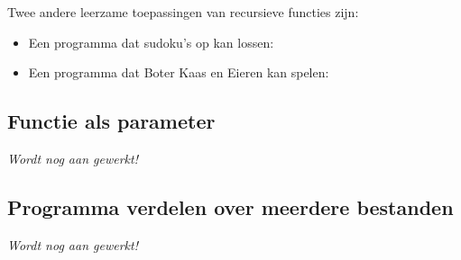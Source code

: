 Twee andere leerzame toepassingen van recursieve functies zijn:
\begin{itemize}
	\item
	Een programma dat sudoku's op kan lossen:
	\iftoggle{ebook}{%
		\href{https://bitbucket.org/HR_ELEKTRO/cpl01/downloads/sudokuEbook.pdf}{sudokuEbook.pdf}%
	}{
		\href{https://bitbucket.org/HR_ELEKTRO/cpl01/downloads/sudoku.pdf}{sudoku.pdf}%
	}
    \item
    Een programma dat Boter Kaas en Eieren kan spelen:  
	\iftoggle{ebook}{%
		\href{https://bitbucket.org/HarryBroeders/dictaat-algoritmen-en-datastructuren-in-c99/downloads/Tic-Tac-Toe_ebook.pdf}{Tic-Tac-Toe\_ebook.pdf}%
	}{
		\href{https://bitbucket.org/HarryBroeders/dictaat-algoritmen-en-datastructuren-in-c99/downloads/Tic-Tac-Toe.pdf}{Tic-Tac-Toe.pdf}%
	}
\end{itemize}

\subsection{Functie als parameter}
\emph{Wordt nog aan gewerkt!}

\subsection{Programma verdelen over meerdere bestanden}
\emph{Wordt nog aan gewerkt!}
